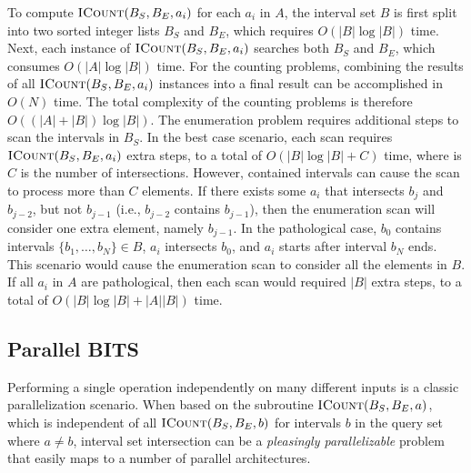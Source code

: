 \documentclass{bioinfo}
\begin{document}
	To compute $\textsc{ICount}(B_S,B_E,a_i)$ for each $a_i$ in $A$, the interval
	set $B$ is first split into two sorted integer lists $B_S$ and $B_E$,
	which requires $O(|B| \log |B|)$ time.  Next, each instance of
	$\textsc{ICount}(B_S,B_E,a_i)$ searches both $B_S$ and $B_E$, which consumes
	$O(|A| \log |B|)$ time.  For the counting problems, combining the
	results of all $\textsc{ICount}(B_S,B_E,a_i)$ instances into a final result can
	be accomplished in $O(N)$ time.  The total complexity of the counting
	problems is therefore $O((|A| + |B|) \log |B|)$.
	The enumeration problem requires additional steps to scan the
	intervals in $B_S$.  In the best case scenario, each scan requires
	$\textsc{ICount}(B_S,B_E,a_i)$ extra steps, to a total of $O(|B| \log |B|
	+ C)$ time, where is $C$ is the number of intersections.
	However,
	contained intervals can cause the scan to process more than $C$
	elements.  If there exists some $a_i$ that intersects $b_{j}$ and
	$b_{j-2}$, but not $b_{j-1}$ (i.e., $b_{j-2}$ contains $b_{j-1}$),
	then the enumeration scan will consider one extra element, namely
	$b_{j-1}$.  In the pathological case, $b_0$ contains intervals $\{b_1,
	\dots, b_N\} \in B$, $a_i$ intersects $b_0$, and $a_i$ starts after
	interval $b_N$ ends.  This scenario would cause the enumeration scan
	to consider all the elements in $B$.  If all $a_i$ in $A$ are
	pathological, then each scan would required $|B|$ extra steps, to a
	total of $O(|B| \log |B| + |A||B|)$ time.


	\subsection{Parallel BITS}

	Performing a single operation independently on many different inputs
	is a classic parallelization scenario.  When based on the subroutine
	$\textsc{ICount}(B_S,B_E,a)$, which is independent of all
	$\textsc{ICount}(B_S,B_E,b)$ for intervals $b$ in the query set where
	$a \neq b$, interval set intersection can be a {\em pleasingly parallelizable}
	problem that easily maps to a number of parallel architectures.
\end{document}
